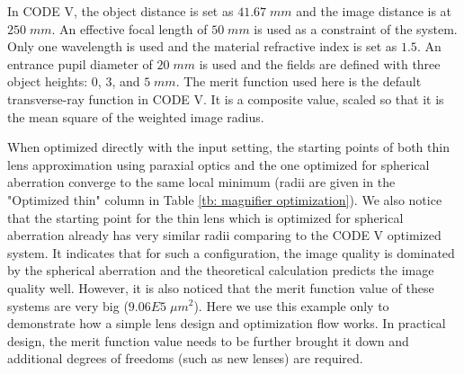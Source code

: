 In CODE V, the object distance is set as $41.67 \; mm$ and the image distance is at $250 \;mm$. An effective focal length of $50 \;mm$ is used as a constraint of the system. Only one wavelength is used and the material refractive index is set as $1.5$. An entrance pupil diameter of $20 \;mm$ is used and the fields are defined with three object heights: $0$, $3$, and $5 \;mm$.  The merit function used here is the default transverse-ray function in CODE V. It is a composite value, scaled so that it is the mean square of the weighted image radius.

When optimized directly with the input setting, the starting points of both thin lens approximation using paraxial optics and the one optimized for spherical aberration converge to the same local minimum (radii are given in the "Optimized thin" column in Table \ref{tb: magnifier optimization}). We also notice that the starting point for the thin lens which is optimized for spherical aberration already has very similar radii comparing to the CODE V optimized system. It indicates that for such a configuration, the image quality is dominated by the spherical aberration and the theoretical calculation predicts the image quality well. However, it is also noticed that the merit function value of these systems are very big ($9.06E5 \;\mu m^{2}$). Here we use this example only to demonstrate how a simple lens design and optimization flow works. In practical design, the merit function value needs to be further brought it down and additional degrees of freedoms (such as new lenses) are required. 

